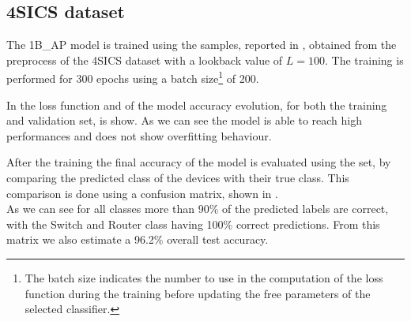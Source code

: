 \subsection{4SICS dataset}
\label{4sics_final_res}

The 1B\_AP model is trained using the samples, reported in , obtained from the preprocess of the 4SICS dataset with a lookback value of $L=100$. The training is performed for 300 epochs using a batch size\footnote{The batch size indicates the number to use in the computation of the loss function during the training before updating the free parameters of the selected classifier.} of 200. 

In  the loss function and of the model accuracy evolution, for both the training and validation set, is show. As we can see the model is able to reach high performances and does not show overfitting behaviour. 

After the training the final accuracy of the model is evaluated using the set, by comparing the predicted class of the devices with their true class. This comparison is done using a confusion matrix, shown in .\\
As we can see for all classes more than 90\% of the predicted labels are correct, with the Switch and Router class having 100\% correct predictions. From this matrix we also estimate a 96.2\% overall test accuracy.

